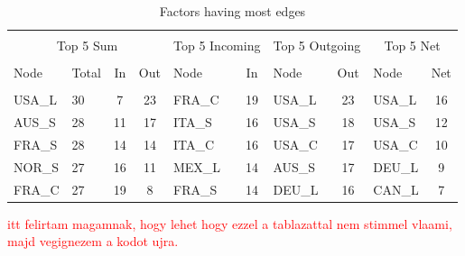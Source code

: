 \documentclass[12pt,bibliography=totoc]{article}
\begin{document}
\begin{table}[h]
\caption{Factors having most edges} %
\fontsize{10}{10}\selectfont
\setlength{\tabcolsep}{10pt}
\centering%
\begin{tabular}{l  lcc  lc lc  lc}%

\hline\hline \\ [-1.5ex]                         %


\multicolumn{4}{c}{Top 5 Sum}					&	\multicolumn{2}{c}{Top 5 Incoming}			&	\multicolumn{2}{c}{Top 5 Outgoing}			&	\multicolumn{2}{c}{Top 5 Net}	\\	
\hline \\ [-1.5ex]    
Node	&	Total 	&	In	&	Out	&	Node	&	In	&	Node	&	Out	&	Node	&	Net	\\
\hline \\ [-1.5ex]    
USA\_L&	30	&	7	&	23	&	FRA\_C	&	19	&	USA\_L	&	23	&	USA\_L	&	16	\\
AUS\_S	&	28	&	11	&	17	&	ITA\_S	&	16	&	USA\_S	&	18	&	USA\_S	&	12	\\
FRA\_S	&	28	&	14	&	14	&	ITA\_C	&	16	&	USA\_C	&	17	&	USA\_C	&	10	\\
NOR\_S	&	27	&	16	&	11	&	MEX\_L	&	14	&	AUS\_S	&	17	&	DEU\_L	&	9	\\
FRA\_C	&	27	&	19	&	8	&	FRA\_S	&	14	&	DEU\_L	&	16	&	CAN\_L	&	7	\\

\hline            
\end{tabular}
\label{table:nonlin}%
\end{table}



\textcolor{red}{itt felirtam magamnak, hogy lehet hogy ezzel a tablazattal nem stimmel vlaami, majd vegignezem a kodot ujra.}
\end{document}
